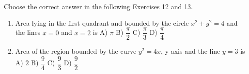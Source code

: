 \documentclass[journal,12pt,twocolumn]{IEEEtran}
\begin{document}
Choose the correct answer in the following   Exercises 12 and 13.
\begin{enumerate} [resume]
\item Area lying in the first quadrant and bounded by the circle ${x}^2 + {y}^2 = 4$ and the lines ${x} = 0$ and ${x} = 2$ is \break \break
A) $\pi$  \hfill B) $\dfrac{\pi}{2}$    \break\break
C) $\dfrac{\pi}{3}$  \hfill D) $\dfrac{\pi}{4}$

\break
\item Area of the region bounded by the curve ${y}^2 = 4{x}$, y-axis and the line ${y} = 3$ is \break\break
A) $2$  \hfill B) $\dfrac{9}{4}$    \break\break
C) $\dfrac{9}{3}$  \hfill D) $\dfrac{9}{2}$

\end{enumerate}
\end{document}
